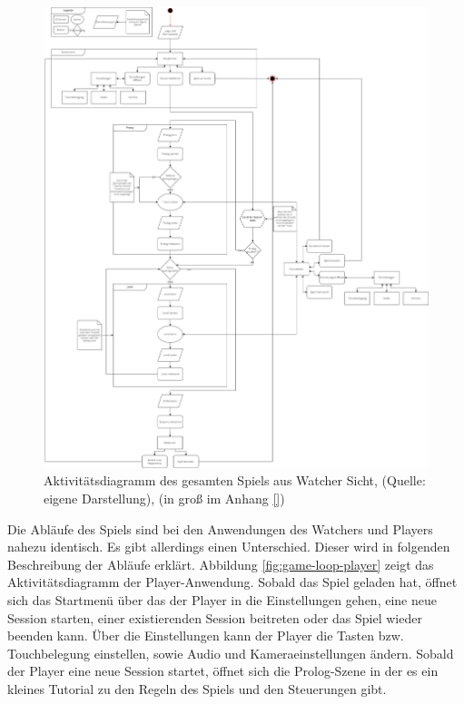 \begin{figure}[ht]
\centering
\includegraphics[width=1\linewidth]{content/pictures/GameLoop-Watcher.drawio.png}
\caption{Aktivitätsdiagramm des gesamten Spiels aus Watcher Sicht, (Quelle: eigene Darstellung), (in groß im Anhang \ref{})}
\label{fig:game-loop-watcher}
\end{figure}

Die Abläufe des Spiels sind bei den Anwendungen des Watchers und Players nahezu identisch. Es gibt allerdings einen Unterschied. Dieser wird in folgenden Beschreibung der Abläufe erklärt.
Abbildung \ref{fig:game-loop-player} zeigt das Aktivitätsdiagramm der Player-Anwendung. Sobald das Spiel geladen hat, öffnet sich das Startmenü über das der Player in die Einstellungen gehen, eine neue Session starten, einer existierenden Session beitreten oder das Spiel wieder beenden kann. Über die Einstellungen kann der Player die Tasten bzw. Touchbelegung einstellen, sowie Audio und Kameraeinstellungen ändern. Sobald der Player eine neue Session startet, öffnet sich die Prolog-Szene in der es ein kleines Tutorial zu den Regeln des Spiels und den Steuerungen gibt. 


